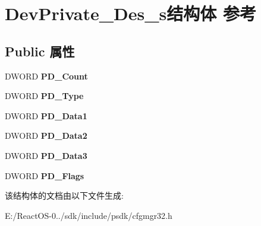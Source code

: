 \hypertarget{struct_dev_private___des__s}{}\section{Dev\+Private\+\_\+\+Des\+\_\+s结构体 参考}
\label{struct_dev_private___des__s}
\subsection*{Public 属性}
\begin{DoxyCompactItemize}
\item 
\mbox{\label{struct_dev_private___des__s_a29f7dfa37fef74fe5ec0926742ce1e2d}} 
D\+W\+O\+RD {\bfseries P\+D\+\_\+\+Count}
\item 
\mbox{\label{struct_dev_private___des__s_a6369f712c250e183bffe3c11c2e3bb80}} 
D\+W\+O\+RD {\bfseries P\+D\+\_\+\+Type}
\item 
\mbox{\label{struct_dev_private___des__s_a825c3be6ce6b4e414bdc9a41e51042bf}} 
D\+W\+O\+RD {\bfseries P\+D\+\_\+\+Data1}
\item 
\mbox{\label{struct_dev_private___des__s_abdf25ff1cde8ecce657cad97153b431d}} 
D\+W\+O\+RD {\bfseries P\+D\+\_\+\+Data2}
\item 
\mbox{\label{struct_dev_private___des__s_ae107edf78bae6ebc88e2513cff304606}} 
D\+W\+O\+RD {\bfseries P\+D\+\_\+\+Data3}
\item 
\mbox{\label{struct_dev_private___des__s_a3bd72295d747520b2d03a208f901079f}} 
D\+W\+O\+RD {\bfseries P\+D\+\_\+\+Flags}
\end{DoxyCompactItemize}


该结构体的文档由以下文件生成\+:\begin{DoxyCompactItemize}
\item 
E\+:/\+React\+O\+S-\/0../sdk/include/psdk/cfgmgr32.\+h\end{DoxyCompactItemize}
